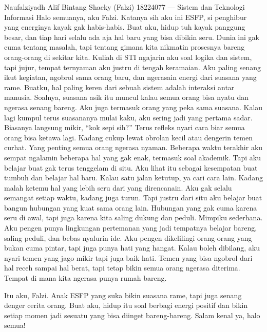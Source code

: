 \documentclass[
  letterpaper,
  DIV=11,
  numbers=noendperiod]{scrreprt}
\begin{document}
Naufalziyadh Alif Bintang Shaeky (Falzi) 18224077 --- Sistem dan
Teknologi Informasi Halo semuanya, aku Falzi. Katanya sih aku ini ESFP,
si penghibur yang energinya kayak gak habis-habis. Buat aku, hidup tuh
kayak panggung besar, dan tiap hari selalu ada aja hal baru yang bisa
dibikin seru. Dunia ini gak cuma tentang masalah, tapi tentang gimana
kita nikmatin prosesnya bareng orang-orang di sekitar kita. Kuliah di
STI ngajarin aku soal logika dan sistem, tapi jujur, tempat ternyaman
aku justru di tengah keramaian. Aku paling senang ikut kegiatan, ngobrol
sama orang baru, dan ngerasain energi dari suasana yang rame. Buatku,
hal paling keren dari sebuah sistem adalah interaksi antar manusia.
Soalnya, suasana asik itu muncul kalau semua orang bisa nyatu dan
ngerasa senang bareng. Aku juga termasuk orang yang peka sama suasana.
Kalau lagi kumpul terus suasananya mulai kaku, aku sering jadi yang
pertama sadar. Biasanya langsung mikir, ``kok sepi sih?'' Terus refleks
nyari cara biar semua orang bisa ketawa lagi. Kadang cukup lewat obrolan
kecil atau dengerin temen curhat. Yang penting semua orang ngerasa
nyaman. Beberapa waktu terakhir aku sempat ngalamin beberapa hal yang
gak enak, termasuk soal akademik. Tapi aku belajar buat gak terus
tenggelam di situ. Aku lihat itu sebagai kesempatan buat tumbuh dan
belajar hal baru. Kalau satu jalan ketutup, ya cari cara lain. Kadang
malah ketemu hal yang lebih seru dari yang direncanain. Aku gak selalu
semangat setiap waktu, kadang juga turun. Tapi justru dari situ aku
belajar buat bangun hubungan yang kuat sama orang lain. Hubungan yang
gak cuma karena seru di awal, tapi juga karena kita saling dukung dan
peduli. Mimpiku sederhana. Aku pengen punya lingkungan pertemanan yang
jadi tempatnya belajar bareng, saling peduli, dan bebas nyalurin ide.
Aku pengen dikelilingi orang-orang yang bukan cuma pintar, tapi juga
punya hati yang hangat. Kalau boleh dibilang, aku nyari temen yang jago
mikir tapi juga baik hati. Temen yang bisa ngobrol dari hal receh sampai
hal berat, tapi tetap bikin semua orang ngerasa diterima. Tempat di mana
kita ngerasa punya rumah bareng.

Itu aku, Falzi. Anak ESFP yang suka bikin suasana rame, tapi juga senang
denger cerita orang. Buat aku, hidup itu soal berbagi energi positif dan
bikin setiap momen jadi sesuatu yang bisa diinget bareng-bareng. Salam
kenal ya, halo semua!


\chapter{}\label{section-1}
\end{document}
